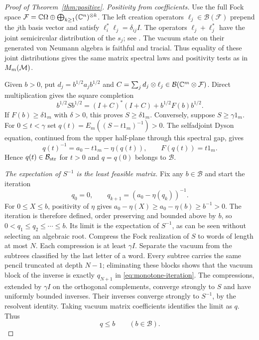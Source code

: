 \begin{proof}[Proof of Theorem~\ref{thm:positive}]
\emph{Positivity from coefficients.}
Use the full Fock space $\mathcal F=\mathbb C\Omega\oplus\bigoplus_{k\ge1}(\mathbb C^n)^{\otimes k}$.
The left creation operators $\ell_j\in\mathcal B(\mathcal F)$ prepend the $j$th basis vector and satisfy $\ell_i^*\ell_j=\delta_{ij}I$.
The operators $\ell_j+\ell_j^*$ have the joint semicircular distribution of the $s_j$; see \cite[Section 2.1, pp.~3--5]{Miy22}.
The vacuum state on their generated von Neumann algebra is faithful and tracial.
Thus equality of these joint distributions gives the same matrix spectral laws and positivity tests as in $M_m(\mathcal M)$.

Given $b>0$, put $d_j=b^{1/2}a_jb^{1/2}$ and $C=\sum_jd_j\otimes\ell_j\in\mathcal B(\mathbb C^m\otimes\mathcal F)$.
Direct multiplication gives the square completion
\begin{equation}\label{eq:fock-square}
 b^{1/2}Sb^{1/2}=(I+C)^*(I+C)+b^{1/2}F(b)b^{1/2}.
\end{equation}
If $F(b)\ge\delta 1_m$ with $\delta>0$, this proves $S\ge\delta 1_m$.
Conversely, suppose $S\ge\gamma 1_m$.
For $0\le t<\gamma$ set $q(t)=E_m((S-t1_m)^{-1})>0$.
The selfadjoint Dyson equation, continued from the upper half-plane through this spectral gap, gives
\begin{equation}\label{eq:gap-dyson}
 q(t)^{-1}=a_0-t1_m-\eta(q(t)),\qquad F(q(t))=t1_m.
\end{equation}
Hence $q(t)\in\mathcal B_{\rm str}$ for $t>0$ and $q=q(0)$ belongs to $\mathcal B$.

\emph{The expectation of $S^{-1}$ is the least feasible matrix.}
Fix any $b\in\mathcal B$ and start the iteration
\begin{equation}\label{eq:monotone-iteration}
 q_0=0,\qquad q_{k+1}=(a_0-\eta(q_k))^{-1}.
\end{equation}
For $0\le X\le b$, positivity of $\eta$ gives $a_0-\eta(X)\ge a_0-\eta(b)\ge b^{-1}>0$.
The iteration is therefore defined, order preserving and bounded above by $b$, so $0<q_1\le q_2\le\cdots\le b$.
Its limit is the expectation of $S^{-1}$, as can be seen without selecting an algebraic root.
Compress the Fock realization of $S$ to words of length at most $N$.
Each compression is at least $\gamma I$.
Separate the vacuum from the subtrees classified by the last letter of a word.
Every subtree carries the same pencil truncated at depth $N-1$; eliminating these blocks shows that the vacuum block of the inverse is exactly $q_{N+1}$ in \eqref{eq:monotone-iteration}.
The compressions, extended by $\gamma I$ on the orthogonal complements, converge strongly to $S$ and have uniformly bounded inverses.
Their inverses converge strongly to $S^{-1}$, by the resolvent identity.
Taking vacuum matrix coefficients identifies the limit as $q$.
Thus
\begin{equation}\label{eq:least-feasible}
 q\le b\qquad(b\in\mathcal B).
\end{equation}


\end{proof}
